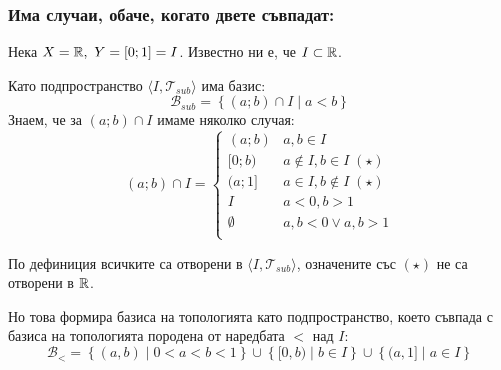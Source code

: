 \subsubsection*{Има случаи, обаче, когато двете съвпадат:}
\begin{example}
    Нека $X = {\mathbb{R}},\ Y = [0; 1] = I$. Известно ни е, че $I \subset {\mathbb{R}}$.

    Като подпространство $\langle I, \mathcal T_{sub}\rangle$ има базис:
    \begin{equation}
        \mathcal B_{sub} = \left\{(a; b) \cap I\mid a < b\right\}
    \end{equation}
    Знаем, че за $(a; b) \cap I$ имаме няколко случая:
    \begin{equation}
        (a; b) \cap I = \begin{cases}
            (a; b)      & a, b \in I \\
            [0; b)      & a \notin I, b \in I\; (\star)\\
            (a; 1]      & a \in I, b \notin I\; (\star)\\
            I           & a < 0, b > 1 \\
            \emptyset   & a, b < 0 \lor a, b > 1 \\
        \end{cases}
    \end{equation}

    По дефиниция всичките са отворени в $\langle I, \mathcal T_{sub} \rangle$, означените със $(\star)$ не са отворени в ${\mathbb{R}}$. 
    
    Но това формира базиса на топологията като подпространство, което съвпада с базиса на топологията породена от наредбата $<$ над $I$:
    \begin{equation}
         \mathcal B_< = \left\{(a,b) \mid 0 < a < b < 1\right\} \cup \left\{ [0, b) \mid b \in I \right\} \cup \left\{ (a, 1] \mid a \in I \right\}
    \end{equation}
\end{example}